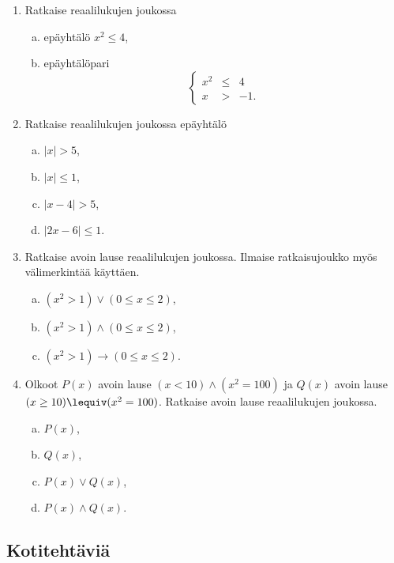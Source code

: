 \begin{enumerate}
\item
Ratkaise reaalilukujen joukossa
\begin{enumerate}[a)]
\item epäyhtälö $x^2 \le 4$,
\item epäyhtälöpari
\[
\left\{
\begin{array}{rcl}
x^2 & \le & 4 \\
x & > & -1.
\end{array}\right.
\]
\end{enumerate}

\item
Ratkaise reaalilukujen joukossa epäyhtälö
\begin{enumerate}[a)]
\item $|x| > 5$,
\item $|x| \le 1$,
\item $|x - 4| > 5$,
\item $|2x - 6| \le 1$.
\end{enumerate}

\item Ratkaise avoin lause reaalilukujen joukossa. Ilmaise ratkaisujoukko myös välimerkintää käyttäen.
\begin{enumerate}[a)]
\item $(x^2 > 1) \lor (0 \le x \le 2)$,
\item $(x^2 > 1) \land (0 \le x \le 2)$,
\item $(x^2 > 1) \to (0 \le x \le 2)$.
\end{enumerate}

\item
Olkoot $P(x)$ avoin lause $(x < 10) \land (x^2 = 100)$ ja
$Q(x)$ avoin lause $(x \ge 10) \lequiv (x^2 = 100)$. Ratkaise avoin lause reaalilukujen joukossa.
\begin{enumerate}[a)]
\item $P(x)$,
\item $Q(x)$,
\item $P(x) \lor Q(x)$,
\item $P(x) \land Q(x)$.
\end{enumerate}


\end{enumerate}

\subsection*{Kotitehtäviä}

